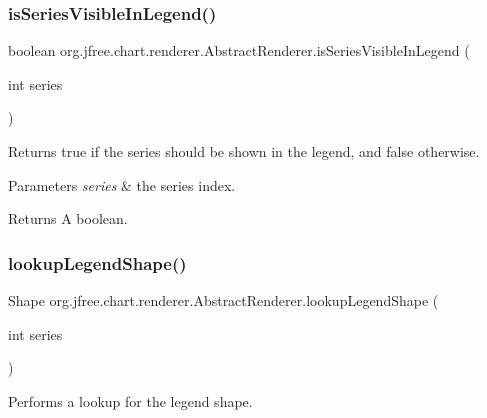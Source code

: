 \subsubsection{\texorpdfstring{is\+Series\+Visible\+In\+Legend()}{isSeriesVisibleInLegend()}}
{\footnotesize\ttfamily boolean org.\+jfree.\+chart.\+renderer.\+Abstract\+Renderer.\+is\+Series\+Visible\+In\+Legend (\begin{DoxyParamCaption}\item[{int}]{series }\end{DoxyParamCaption})}

Returns {\ttfamily true} if the series should be shown in the legend, and {\ttfamily false} otherwise.


\begin{DoxyParams}{Parameters}
{\em series} & the series index.\\
\hline
\end{DoxyParams}
\begin{DoxyReturn}{Returns}
A boolean. 
\end{DoxyReturn}
\mbox{\label{classorg_1_1jfree_1_1chart_1_1renderer_1_1_abstract_renderer_a2de16cff7b8eb8ea2612037b0b7321a0}} 
\subsubsection{\texorpdfstring{lookup\+Legend\+Shape()}{lookupLegendShape()}}
{\footnotesize\ttfamily Shape org.\+jfree.\+chart.\+renderer.\+Abstract\+Renderer.\+lookup\+Legend\+Shape (\begin{DoxyParamCaption}\item[{int}]{series }\end{DoxyParamCaption})}

Performs a lookup for the legend shape.


